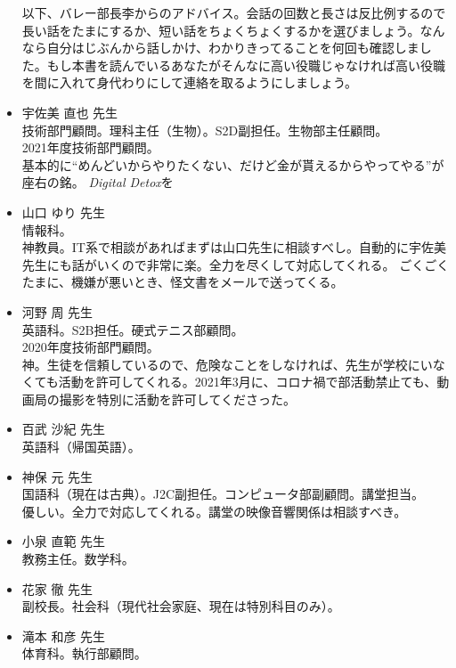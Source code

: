 \documentclass[dvipdfmx,jb5]{jarticle}
\begin{document}
\begin{itemize}
  以下、バレー部長李からのアドバイス。会話の回数と長さは反比例するので長い話をたまにするか、短い話をちょくちょくするかを選びましょう。なんなら自分はじぶんから話しかけ、わかりきってることを何回も確認しました。もし本書を読んでいるあなたがそんなに高い役職じゃなければ高い役職を間に入れて身代わりにして連絡を取るようにしましょう。

  \item 宇佐美 直也 先生\\
  技術部門顧問。理科主任（生物）。S2D副担任。生物部主任顧問。\\
  2021年度技術部門顧問。\\
  基本的に``めんどいからやりたくない、だけど金が貰えるからやってやる''が座右の銘。
  \textit{Digital Detox}を

  \item 山口 ゆり 先生\\
   情報科。\\
   神教員。IT系で相談があればまずは山口先生に相談すべし。自動的に宇佐美先生にも話がいくので非常に楽。全力を尽くして対応してくれる。
   ごくごくたまに、機嫌が悪いとき、怪文書をメールで送ってくる。

  \item 河野 周 先生\\
  英語科。S2B担任。硬式テニス部顧問。\\
  2020年度技術部門顧問。\\
  神。生徒を信頼しているので、危険なことをしなければ、先生が学校にいなくても活動を許可してくれる。2021年3月に、コロナ禍で部活動禁止ても、動画局の撮影を特別に活動を許可してくださった。

  \item 百武 沙紀 先生\\
  英語科（帰国英語）。

  \item 神保 元 先生\\
  国語科（現在は古典）。J2C副担任。コンピュータ部副顧問。講堂担当。\\
  優しい。全力で対応してくれる。講堂の映像音響関係は相談すべき。

  \item 小泉 直範 先生\\
  教務主任。数学科。

  \item 花家 徹 先生\\
  副校長。社会科（現代社会家庭、現在は特別科目のみ）。

  \item 滝本 和彦 先生\\
  体育科。執行部顧問。


\end{itemize}
\end{document}

